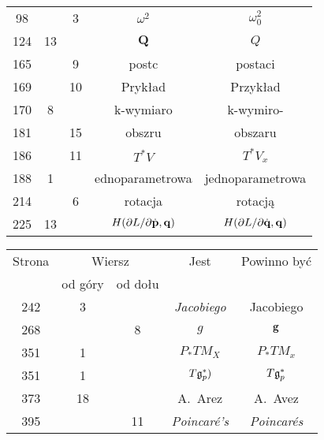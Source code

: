 \documentclass[a4paper,11pt]{article}
\numberwithin{equation}{section}
\begin{document}
\begin{center}
\begin{tabular}{|c|c|c|c|c|}
    98  & &  3 & $\omega^{ 2 }$ & $\omega_{ 0 }^{ 2 }$ \\
    124 & 13 & & $\mathbf{Q}$ & $Q$ \\
    165 & &  9 & postc & postaci \\
    169 & & 10 & Prykład & Przykład \\
    170 & 8 & & k-wymiaro & k-wymiro- \\
    181 & & 15 & obszru & obszaru \\
    186 & & 11 & $T^{ * } V$ & $T^{ * } V_{ x }$ \\
    188 & 1 & & ednoparametrowa & jednoparametrowa \\
    214 & & 6 & rotacja & rotacją \\
    225 & 13 & & $H( \partial L / \partial \dot{ \mathbf{p} }, \mathbf{q} )$
           & $H( \partial L / \partial \dot{ \mathbf{q} }, \mathbf{q} )$ \\
    \hline
  \end{tabular}





  \newpage

  \begin{tabular}{|c|c|c|c|c|}
    \hline
    Strona & \multicolumn{2}{c|}{Wiersz} & Jest
                              & Powinno być \\ \cline{2-3}
    & od góry & od dołu & & \\
    \hline
    242 &  3 & & \textit{Jacobiego} & Jacobiego \\
    268 & &  8 & $g$ & $\mathbf{g}$ \\
    351 &  1 & & $P_{ * }TM_{ X }$ & $P_{ * }TM_{ x }$ \\
    351 &  1 & & $T\mathfrak{g}_{ p }^{ * })$ & $T\mathfrak{g}_{ p }^{ * }$ \\
    373 & 18 & & A.~Arez & A.~Avez \\
    395 & & 11 & \textit{Poincar\'{e}'s} & \textit{Poincar\'{e}s} \\
    \hline
  \end{tabular}

\end{center}

\vspace{\spaceTwo}
\end{document}
